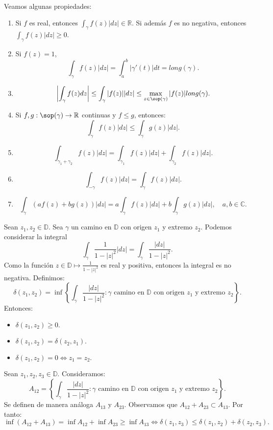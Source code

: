 Veamos algunas propiedades:
\begin{enumerate}
    \item Si $f$ es real, entonces $\int_\gamma f(z)|dz| \in \mathbb{R}$.
          Si además $f$ es no negativa, entonces $\int_\gamma f(z)|dz| \geq 0$.
    \item Si $f(z) = 1$,
          $$\int_\gamma f(z)|dz| = \int_a^b |\gamma'(t)|dt = long(\gamma).$$
    \item $$\left|\int_\gamma f(z)dz\right| \leq \int_\gamma |f(z)||dz| \leq \max_{z \in \sop(\gamma)} |f(z)|long(\gamma).$$
    \item Si $f, g: \sop(\gamma) \to \mathbb{R}$ continuas y $f \leq g$, entonces:
          $$\int_\gamma f(z)|dz| \leq \int_\gamma g(z)|dz|.$$
    \item $$\int_{\gamma_1 + \gamma_2} f(z)|dz| = \int_{\gamma_1} f(z)|dz| + \int_{\gamma_2} f(z)|dz|.$$
    \item $$\int_{-\gamma} f(z)|dz| = \int_\gamma f(z)|dz|.$$
    \item $$\int_\gamma (af(z) + bg(z))|dz| = a\int_\gamma f(z)|dz| + b\int_\gamma g(z)|dz|, \quad a, b \in \mathbb{C}.$$
\end{enumerate}

Sean $z_1, z_2 \in \mathbb{D}$.
Sea $\gamma$ un camino en $\mathbb{D}$ con origen $z_1$ y extremo $z_2$.
Podemos considerar la integral
$$\int_\gamma \frac{1}{1-|z|^2}|dz| = \int_\gamma \frac{|dz|}{1-|z|^2}.$$
Como la función $z \in \mathbb{D} \mapsto \frac{1}{1-|z|^2}$ es real y positiva, entonces la integral es no negativa.
Definimos:
$$\delta(z_1, z_2) = \inf \left\{\int_\gamma \frac{|dz|}{1-|z|^2} : \gamma \text{ camino en } \mathbb{D} \text{ con origen } z_1 \text{ y extremo } z_2\right\}.$$
Entonces:
\begin{itemize}
    \item $\delta(z_1, z_2) \geq 0$.
    \item $\delta(z_1, z_2) = \delta(z_2, z_1)$.
    \item $\delta(z_1, z_2) = 0 \Leftrightarrow z_1 = z_2$.
\end{itemize}

Sean $z_1, z_2, z_3 \in \mathbb{D}$.
Consideramos:
$$A_{12} = \left\{\int_\gamma \frac{|dz|}{1-|z|^2} : \gamma \text{ camino en } \mathbb{D} \text{ con origen } z_1 \text{ y extremo } z_2\right\}.$$
Se definen de manera análoga $A_{13}$ y $A_{23}$.
Observamos que $A_{12} + A_{23} \subset A_{13}$.
Por tanto:
$$\inf(A_{12} + A_{13}) = \inf A_{12} + \inf A_{23} \geq \inf A_{13} \Leftrightarrow \delta(z_1, z_3) \leq \delta(z_1, z_2) + \delta(z_2, z_3).$$

